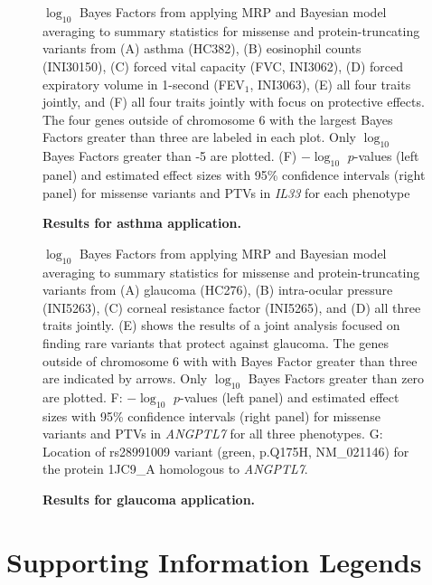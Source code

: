 \begin{figure}[!h]
\caption{{\bf Results for asthma application.}}
\label{asthma_bma}
$\log_{10}$ Bayes Factors from applying MRP and Bayesian model averaging to summary statistics for missense and protein-truncating variants from (A) asthma (HC382), (B) eosinophil counts (INI30150), (C) forced vital capacity (FVC, INI3062), (D) forced expiratory volume in 1-second (FEV$_1$, INI3063), (E) all four traits jointly, and (F) all four traits jointly with focus on protective effects. The four genes outside of chromosome 6 with the largest Bayes Factors greater than three are labeled in each plot. Only $\log_{10}$ Bayes Factors greater than -5 are plotted. (F) $-\log_{10}$ $p$-values (left panel) and estimated effect sizes with 95\% confidence intervals (right panel) for missense variants and PTVs in \textit{IL33} for each phenotype
\end{figure}

\begin{figure}[!h]
\caption{{\bf Results for glaucoma application.}}
\label{glaucoma_bma}
$\log_{10}$ Bayes Factors from applying MRP and Bayesian model averaging to summary statistics for missense and protein-truncating variants from (A) glaucoma (HC276), (B) intra-ocular pressure (INI5263), (C) corneal resistance factor (INI5265), and (D) all three traits jointly. (E) shows the results of a joint analysis focused on finding rare variants that protect against glaucoma. The genes outside of chromosome 6 with with Bayes Factor greater than three are indicated by arrows. Only $\log_{10}$ Bayes Factors greater than zero are plotted. F: $-\log_{10}$ $p$-values (left panel) and estimated effect sizes with 95\% confidence intervals (right panel) for missense variants and PTVs in \textit{ANGPTL7} for all three phenotypes. G: Location of rs28991009 variant (green, p.Q175H, NM\_021146) for the protein 1JC9\_A homologous to \textit{ANGPTL7}.
\end{figure}

\pagebreak

\section*{Supporting Information Legends}


